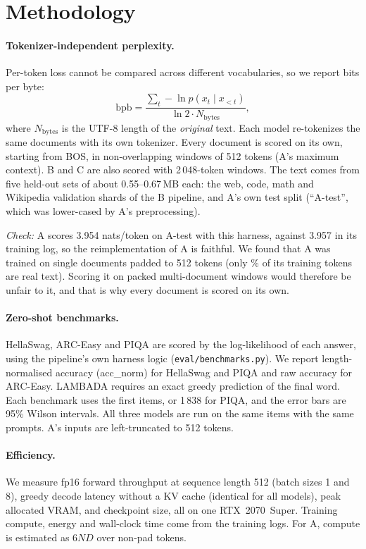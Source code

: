\documentclass[10pt,a4paper]{article}
\begin{document}
\section{Methodology}

\paragraph{Tokenizer-independent perplexity.}
Per-token loss cannot be compared across different vocabularies, so we report bits per byte:
\[
\text{bpb}=\frac{\sum_t -\ln p(x_t\mid x_{<t})}{\ln 2\cdot N_\text{bytes}},
\]
where $N_\text{bytes}$ is the UTF-8 length of the \emph{original} text.
Each model re-tokenizes the same documents with its own tokenizer. Every document is scored on its own, starting from BOS, in non-overlapping windows of 512 tokens (A's maximum context). B and C are also scored with 2\,048-token windows.
The text comes from five held-out sets of about 0.55--0.67\,MB each:
the web, code, math and Wikipedia validation shards of the B pipeline, and A's own test split (``A-test'', which was lower-cased by A's preprocessing).

\emph{Check:} A scores 3.954 nats/token on A-test with this harness, against 3.957 in its training log, so the reimplementation of A is faithful.
We found that A was trained on single documents padded to 512 tokens (only \nonpadA\% of its training tokens are real text). Scoring it on packed multi-document windows would therefore be unfair to it, and that is why every document is scored on its own.

\paragraph{Zero-shot benchmarks.}
HellaSwag, ARC-Easy and PIQA are scored by the log-likelihood of each answer, using the pipeline's own harness logic (\texttt{eval/benchmarks.py}). We report length-normalised accuracy (acc\_norm) for HellaSwag and PIQA and raw accuracy for ARC-Easy. LAMBADA requires an exact greedy prediction of the final word. Each benchmark uses the first \benchN{} items, or 1\,838 for PIQA, and the error bars are 95\% Wilson intervals.
All three models are run on the same items with the same prompts. A's inputs are left-truncated to 512 tokens.

\paragraph{Efficiency.}
We measure fp16 forward throughput at sequence length 512 (batch sizes 1 and 8), greedy decode latency without a KV cache (identical for all models), peak allocated VRAM, and checkpoint size, all on one RTX~2070~Super.
Training compute, energy and wall-clock time come from the training logs. For A, compute is estimated as $6ND$ over non-pad tokens.
\end{document}

